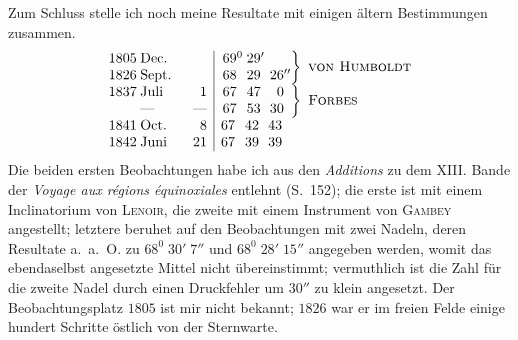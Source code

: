 Zum Schluss stelle ich noch meine Resultate mit einigen ältern Bestimmungen zusammen.
\begingroup
\newcommand{\GaussVReviewDate}[3]{#1&\makebox[2.6em][l]{#2}&\makebox[1.15em][r]{#3}}
\newcommand{\GaussVReviewAngle}[6]{#1&\makebox[.36em][l]{\ensuremath{{}^{#2}}}&%
  #3&\makebox[.30em][l]{\ensuremath{{}^{#4}}}&%
  #5&\makebox[.48em][l]{\ensuremath{{}^{#6}}}}
\[
\begin{array}{r|l}
\begin{array}{@{}r@{\hspace{.25em}}lr@{}}\GaussVReviewDate{1805}{Dec.}{}\\\GaussVReviewDate{1826}{Sept.}{}\end{array}&
\left.\begin{array}{@{}r@{}l@{\hspace{.35em}}r@{}l@{\hspace{.35em}}r@{}l@{}}\GaussVReviewAngle{69}{0}{29}{\prime}{}{}\\\GaussVReviewAngle{68}{}{29}{}{26}{\prime\prime}\end{array}\right\}\ \text{\textsc{von Humboldt}}\\
\begin{array}{@{}r@{\hspace{.25em}}lr@{}}\GaussVReviewDate{1837}{Juli}{1}\\\GaussVReviewDate{}{—}{—}\end{array}&
\left.\begin{array}{@{}r@{}l@{\hspace{.35em}}r@{}l@{\hspace{.35em}}r@{}l@{}}\GaussVReviewAngle{67}{}{47}{}{0}{}\\\GaussVReviewAngle{67}{}{53}{}{30}{}\end{array}\right\}\ \text{\textsc{Forbes}}\\
\begin{array}{@{}r@{\hspace{.25em}}lr@{}}\GaussVReviewDate{1841}{Oct.}{8}\\\GaussVReviewDate{1842}{Juni}{21}\end{array}&
\begin{array}{@{}r@{}l@{\hspace{.35em}}r@{}l@{\hspace{.35em}}r@{}l@{}}\GaussVReviewAngle{67}{}{42}{}{43}{}\\\GaussVReviewAngle{67}{}{39}{}{39}{}\end{array}
\end{array}
\]
\endgroup
Die beiden ersten Beobachtungen habe ich aus den \textit{Additions} zu dem XIII. Bande der \textit{Voyage aux régions équinoxiales} entlehnt (S.\ 152); die erste ist mit einem Inclinatorium von \textsc{Lenoir}, die zweite mit einem Instrument von \textsc{Gambey} angestellt; letztere beruhet auf den Beobachtungen mit zwei Nadeln, deren Resultate a.\ a.\ O. zu $68^0\;30'\;7''$ und $68^0\;28'\;15''$ angegeben werden, womit das ebendaselbst angesetzte Mittel nicht übereinstimmt; vermuthlich ist die Zahl für die zweite Nadel durch einen Druckfehler um $30''$ zu klein angesetzt. Der Beobachtungsplatz $1805$ ist mir nicht bekannt; $1826$ war er im freien Felde einige hundert Schritte östlich von der Sternwarte.

